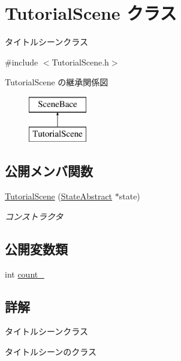 \hypertarget{class_tutorial_scene}{}\section{Tutorial\+Scene クラス}
\label{class_tutorial_scene}


タイトルシーンクラス  




{\ttfamily \#include $<$Tutorial\+Scene.\+h$>$}

Tutorial\+Scene の継承関係図\begin{figure}[H]
\begin{center}
\leavevmode
\includegraphics[height=2.000000cm]{class_tutorial_scene}
\end{center}
\end{figure}
\subsection*{公開メンバ関数}
\begin{DoxyCompactItemize}
\item 
\mbox{\hyperlink{class_tutorial_scene_ad4cae04d2651e485f7f7233f4fd810a7}{Tutorial\+Scene}} (\mbox{\hyperlink{class_scene_bace_1_1_state_abstract}{State\+Abstract}} $\ast$state)
\begin{DoxyCompactList}\small\item\em コンストラクタ \end{DoxyCompactList}\end{DoxyCompactItemize}
\subsection*{公開変数類}
\begin{DoxyCompactItemize}
\item 
int \mbox{\hyperlink{class_tutorial_scene_a8db8cdfb7bf91dbab3353cfb54593bf9}{count\+\_\+}}
\end{DoxyCompactItemize}


\subsection{詳解}
タイトルシーンクラス 

タイトルシーンのクラス 

